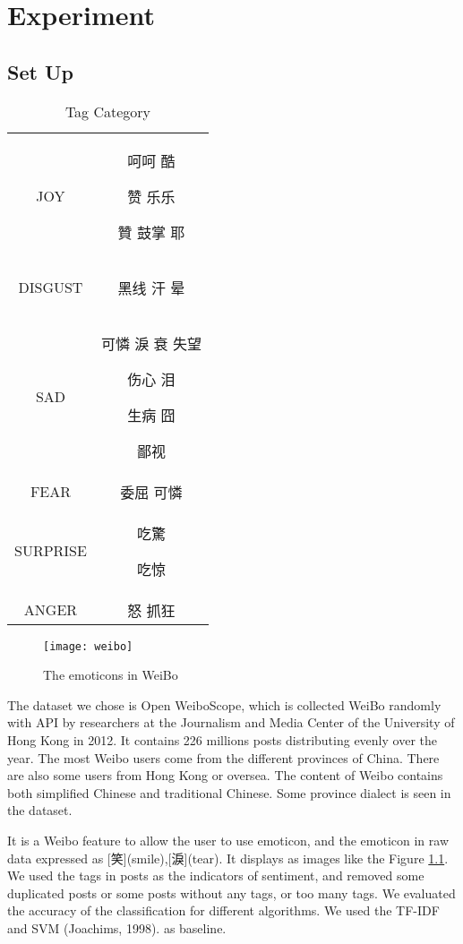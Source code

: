 \chapter{Experiment}

\section{Set Up}

\begin{table}[]
\centering
\caption{Tag Category}
\label{CategoryTable}
\begin{tabular}{|c|c|}
\hline
JOY  & 呵呵 酷 \begin{CJK}{UTF8}{gbsn}赞 乐乐\end{CJK} 贊 鼓掌 耶 \\
DISGUST & \begin{CJK}{UTF8}{gbsn}黑线 汗 晕\end{CJK} \\
SAD &   可憐 淚 衰 失望 \begin{CJK}{UTF8}{gbsn}伤心 泪\end{CJK} 生病 囧 \begin{CJK}{UTF8}{gbsn}鄙视\end{CJK}  \\
FEAR &  委屈  可憐 \\
SURPRISE &  吃驚  \begin{CJK}{UTF8}{gbsn}吃惊\end{CJK} \\
ANGER & 怒 抓狂 \\
\hline
\end{tabular}
\end{table}

\begin{figure}[h]
    \centering
	\texttt{[image: weibo]}
    \caption{The emoticons in WeiBo}
    \label{fig:weibo}
\end{figure}

The dataset we chose is Open WeiboScope\cite{fu2013reality}, which is collected WeiBo randomly with API by researchers at the Journalism and Media Center of the University of Hong Kong in 2012. 
It contains 226 millions posts distributing evenly over the year.  
The most Weibo users come from the different provinces of China. There are also some users from Hong Kong or oversea. 
The content of Weibo contains both simplified Chinese and traditional Chinese. Some province dialect is seen in the dataset.

It is a Weibo feature to allow the user to use emoticon, 
and the emoticon in raw data expressed as [笑](smile),[淚](tear). It displays as images like the Figure \ref{fig:weibo}. 
We used the tags in posts as the indicators of sentiment, and removed some duplicated posts or some posts without any tags, or too many tags. 
We evaluated the accuracy of the classification for different algorithms. We used the TF-IDF and SVM (Joachims, 1998). as baseline.

